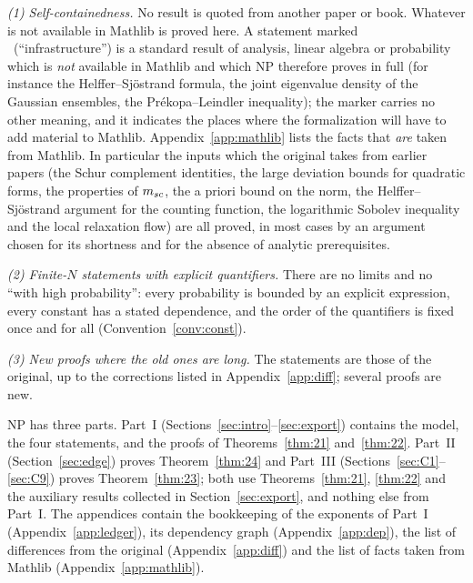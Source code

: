 \emph{(1) Self-containedness.} No result is quoted from another paper or book. Whatever is not available in Mathlib is proved here. A statement marked \infra\ (``infrastructure'') is a standard result of analysis, linear algebra or probability
which is \emph{not} available in Mathlib and which NP therefore proves in full (for instance the Helffer--Sj\"ostrand formula, the joint eigenvalue density of the Gaussian ensembles,
the Pr\'ekopa--Leindler inequality); the marker carries no other meaning, and it indicates the places where the formalization will have to add material to Mathlib.
Appendix~\ref{app:mathlib} lists the facts that \emph{are} taken from Mathlib. In particular the inputs which the original takes from earlier papers
(the Schur complement identities, the large deviation bounds for quadratic forms, the properties of $m_{sc}$, the a priori bound on the norm, the Helffer--Sj\"ostrand
argument for the counting function, the logarithmic Sobolev inequality and the local relaxation flow) are all proved, in most cases by an argument chosen for
its shortness and for the absence of analytic prerequisites.

\emph{(2) Finite-$N$ statements with explicit quantifiers.} There are no limits and no ``with high probability'': every probability is bounded by an explicit expression,
every constant has a stated dependence, and the order of the quantifiers is fixed once and for all (Convention~\ref{conv:const}).

\emph{(3) New proofs where the old ones are long.} The statements are those of the original, up to the corrections listed in Appendix~\ref{app:diff}; several proofs are new.

NP has three parts. Part~I (Sections~\ref{sec:intro}--\ref{sec:export}) contains the model, the four statements, and the proofs of Theorems~\ref{thm:21}
and~\ref{thm:22}. Part~II (Section~\ref{sec:edge}) proves Theorem~\ref{thm:24} and Part~III (Sections~\ref{sec:C1}--\ref{sec:C9}) proves Theorem~\ref{thm:23}; both use Theorems~\ref{thm:21}, \ref{thm:22} and the auxiliary results
collected in Section~\ref{sec:export}, and nothing else from Part~I. The appendices contain the bookkeeping of the exponents of Part~I (Appendix~\ref{app:ledger}), its dependency graph
(Appendix~\ref{app:dep}), the list of differences from the original (Appendix~\ref{app:diff}) and the list of facts taken from Mathlib (Appendix~\ref{app:mathlib}).

